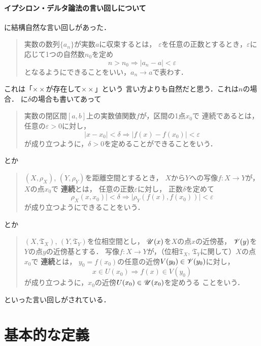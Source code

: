 \paragraph{イプシロン・デルタ論法の言い回しについて}
\cite[p.26]{Mori81}に結構自然な言い回しがあった．
\begin{quotation}
    実数の数列\(\{a_n\}\)が実数\(a\)に収束するとは，
    \(\varepsilon\)を任意の正数とするとき，\(\varepsilon\)に
    応じて1つの自然数\(n_0\)を定め
    \[
        n>n_0\Longrightarrow\lvert a_n- a\rvert <\varepsilon
    \]
    となるようにできることをいい，\(a_n\to a\)で表わす．
\end{quotation}
これは「\(\times\times\)が存在して\(\times\times\)」という
言い方よりも自然だと思う．これは\(n\)の場合．
\cite[pp.67--68]{Mori81}に\(\delta\)の場合も書いてあって
\begin{quotation}
    実数の閉区間\([a,b]\)上の実数値関数\(f\)が，区間の1点\(x_0\)で
    連続であるとは，
    任意の\(\varepsilon>0\)に対し，
    \[
        \lvert x- x_0\rvert<\delta
        \Longrightarrow
        \lvert f(x)- f(x_0)\rvert <\varepsilon
    \]
    が成り立つように，\(\delta>0\)を定めることができることをいう．
\end{quotation}
とか
\begin{quotation}
    \((X,\rho_X)\), 
    \((Y,\rho_Y)\)を距離空間とするとき，
    \(X\)から\(Y\)への写像\(f\colon X\to Y\)が，\(X\)の点\(x_0\)で
    \textbf{連続}とは，
    任意の正数\(\varepsilon\)に対し，
    正数\(\delta\)を定めて
    \[
        \rho_X(x, x_0)\rvert<\delta
        \Longrightarrow
        \lvert \rho_Y(f(x),f(x_0))\rvert <\varepsilon
    \]
    が成り立つようにできることをいう．
\end{quotation}
とか
\begin{quotation}
    \((X,\mathfrak{T}_X)\), 
    \((Y,\mathfrak{T}_Y)\)を位相空間とし，
    \(\mathscr{U}(x)\)を\(X\)の点\(x\)の近傍基，
    \(\mathscr{V}(y)\)を\(Y\)の点\(y\)の近傍基とする．
    写像\(f\colon X\to Y\)が，（位相\(\mathfrak{T}_X\), 
    \(\mathfrak{T}_Y\)に関して）\(X\)の点\(x_0\)で
    \textbf{連続}とは，
    \(y_0=f(x_0)\)の任意の近傍\(V(y_0)\in\mathscr{V}(y_0)\)に対し，
    \[
        x\in U(x_0)
        \Longrightarrow
        f(x)\in V(y_0)
    \]
    が成り立つように，\(x_0\)の近傍\(U(x_0)\in \mathscr{U}(x_0)\)を定めうる
    ことをいう．
\end{quotation}
といった言い回しがされている．
\section{基本的な定義}







